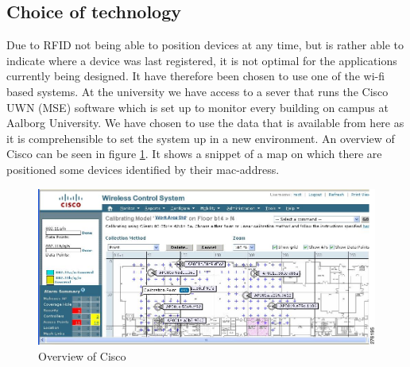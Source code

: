 \subsection{Choice of technology}\label{subsec:cisco}
Due to RFID not being able to position devices at any time, but is rather able to indicate where a device was last registered, it is not optimal for the applications currently being designed. It have therefore been chosen to use one of the wi-fi based systems.
At the university we have access to a sever that runs the Cisco UWN (MSE) software which is set up to monitor every building on campus at Aalborg University. We have chosen to use the data that is available from here as it is comprehensible to set the system up in a new environment. An overview of Cisco can be seen in figure \ref{fig:cisco_overveiw}. It shows a snippet of a map on which there are positioned some devices identified by their mac-address.

\begin{figure}[h]
	\begin{center}
	\includegraphics[scale=1]{graphics/cisco_overview.png}
	\caption{Overview of Cisco\cite{cisco_overview}}
	\label{fig:cisco_overveiw}
	\end{center}
\end{figure}

